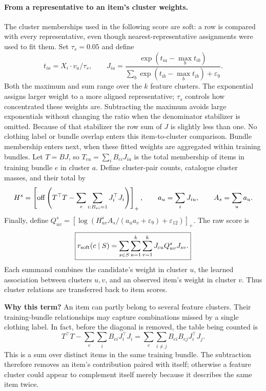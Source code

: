 \documentclass[11pt,a4paper]{article}
\newcommand{\off}{\operatorname{off}}\newcommand{\diag}{\operatorname{diag}}
\newcommand{\why}{\par\textbf{Why this term?} }
\numberwithin{equation}{section}
\begin{document}
\paragraph{From a representative to an item's cluster weights.}
The cluster memberships used in the following score are soft: a row is compared with every
representative, even though nearest-representative assignments were used to fit
them. Set $\tau_s=0.05$ and define
\begin{equation}
 t_{ia}=X_i\cdot v_a/\tau_s,\qquad
 J_{ia}=\frac{\exp(t_{ia}-\max_b t_{ib})}
 {\sum_b\exp(t_{ib}-\max_b t_{ib})+\varepsilon_9}.
\end{equation}
Both the maximum and sum range over the $k$ feature clusters. The exponential
assigns larger weight to a more aligned representative; $\tau_s$ controls how
concentrated these weights are. Subtracting the maximum avoids large exponentials
without changing the ratio when the denominator stabilizer is omitted. Because
of that stabilizer the row sum of $J$ is slightly less than one. No clothing
label or bundle overlap enters this item-to-cluster comparison. Bundle membership
enters next, when these fitted weights are aggregated within training bundles.
Let $T=BJ$, so $T_{ea}=\sum_iB_{ei}J_{ia}$ is the total membership of
items in training bundle $e$ in cluster $a$. Define cluster-pair counts, catalogue cluster
masses, and their total by
\begin{equation}
 H^s=\pos{\off\left(T^\top T-\sum_e\sum_{i:B_{ei}=1}J_i^\top J_i\right)},\qquad
 a_u=\sum_iJ_{iu},\qquad A_s=\sum_u a_u.
\end{equation}
Finally, define $Q^s_{uv}=[\log(H^s_{uv}A_s/(a_u a_v+\varepsilon_9)+\varepsilon_{12})]_+$.
The raw score is
\begin{equation}
 \boxed{r_{\rm soft}(c\mid S)
 =\sum_{s\in S}\sum_{u=1}^k\sum_{v=1}^k J_{cu}Q^s_{uv}J_{sv}.}
\end{equation}
Each summand combines the candidate's weight in cluster $u$, the learned
association between clusters $u,v$, and an observed item's weight in cluster $v$.
Thus cluster relations are transferred back to item scores.
\why An item can partly belong to several feature clusters. Their training-bundle
relationships may capture combinations missed by a single clothing label. In fact, before the diagonal is removed, the table being counted is
\[
T^\top T-\sum_e\sum_i B_{ei}J_i^\top J_i
=\sum_e\sum_{i\ne j}B_{ei}B_{ej}J_i^\top J_j.
\]
This is a sum over distinct items in the same training bundle. The subtraction therefore
removes an item's contribution paired with itself; otherwise a feature cluster
could appear to complement itself merely because it describes the same item twice.
\end{document}
